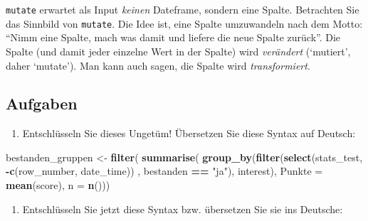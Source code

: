 \documentclass[12pt,ngerman,]{book}
\makeatletter
\newenvironment{Shaded}{\begin{snugshade}}{\end{snugshade}}
\newcommand{\KeywordTok}[1]{\textcolor[rgb]{0.13,0.29,0.53}{\textbf{#1}}}
\newcommand{\DataTypeTok}[1]{\textcolor[rgb]{0.13,0.29,0.53}{#1}}
\newcommand{\StringTok}[1]{\textcolor[rgb]{0.31,0.60,0.02}{#1}}
\newcommand{\OperatorTok}[1]{\textcolor[rgb]{0.81,0.36,0.00}{\textbf{#1}}}
\newcommand{\NormalTok}[1]{#1}
\providecommand{\tightlist}{%
  \setlength{\itemsep}{0pt}\setlength{\parskip}{0pt}}
\newenvironment{kframe}{%
\medskip{}
\setlength{\fboxsep}{.8em}
 \def\at@end@of@kframe{}%
 \ifinner\ifhmode%
  \def\at@end@of@kframe{\end{minipage}}%
  \begin{minipage}{\columnwidth}%
 \fi\fi%
 \def\FrameCommand##1{\hskip\@totalleftmargin \hskip-\fboxsep
 \colorbox{shadecolor}{##1}\hskip-\fboxsep
     \hskip-\linewidth \hskip-\@totalleftmargin \hskip\columnwidth}%
 \MakeFramed {\advance\hsize-\width
   \@totalleftmargin\z@ \linewidth\hsize
   \@setminipage}}%
 {\par\unskip\endMakeFramed%
 \at@end@of@kframe}
\renewenvironment{Shaded}{\begin{kframe}}{\end{kframe}}
\theoremstyle{definition}
\theoremstyle{definition}
\theoremstyle{remark}
\let\BeginKnitrBlock\begin \let\EndKnitrBlock\end
\makeatother
\begin{document}
\BeginKnitrBlock{rmdcaution}
\texttt{mutate} erwartet als Input \emph{keinen} Dateframe, sondern eine
Spalte. Betrachten Sie das Sinnbild von \texttt{mutate}. Die Idee ist,
eine Spalte umzuwandeln nach dem Motto: ``Nimm eine Spalte, mach was
damit und liefere die neue Spalte zurück''. Die Spalte (und damit jeder
einzelne Wert in der Spalte) wird \emph{verändert} (`mutiert', daher
`mutate'). Man kann auch sagen, die Spalte wird \emph{transformiert}.
\EndKnitrBlock{rmdcaution}

\subsection{Aufgaben}\label{aufgaben-8}

\begin{enumerate}
\def\labelenumi{\arabic{enumi}.}
\tightlist
\item
  Entschlüsseln Sie dieses Ungetüm! Übersetzen Sie diese Syntax auf
  Deutsch:
\end{enumerate}

\begin{Shaded}
\begin{Highlighting}[]

\NormalTok{bestanden_gruppen <-}
\StringTok{  }\KeywordTok{filter}\NormalTok{(}
    \KeywordTok{summarise}\NormalTok{(}
      \KeywordTok{group_by}\NormalTok{(}\KeywordTok{filter}\NormalTok{(}\KeywordTok{select}\NormalTok{(stats_test, }\OperatorTok{-}\KeywordTok{c}\NormalTok{(row_number, date_time)) , bestanden }\OperatorTok{==}\StringTok{ "ja"}\NormalTok{), interest), }
      \DataTypeTok{Punkte =} \KeywordTok{mean}\NormalTok{(score), }\DataTypeTok{n =} \KeywordTok{n}\NormalTok{()))}
\end{Highlighting}
\end{Shaded}

\begin{enumerate}
\def\labelenumi{\arabic{enumi}.}
\setcounter{enumi}{1}
\tightlist
\item
  Entschlüsseln Sie jetzt diese Syntax bzw. übersetzen Sie sie ins
  Deutsche:
\end{enumerate}

\begin{Shaded}
\end{Shaded}
\end{document}
